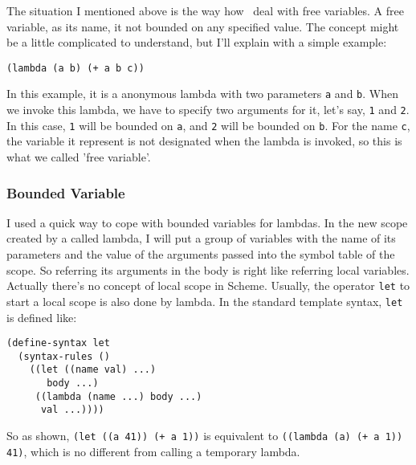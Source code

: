 The situation I mentioned above is the way how \revo\ deal with
free variables. A free variable, as its name, it not bounded on any
specified value. The concept might be a little complicated to
understand, but I'll explain with a simple example:
\begin{verbatim}
(lambda (a b) (+ a b c))
\end{verbatim}

In this example, it is a anonymous lambda with two parameters \verb+a+
and \verb+b+. When we invoke this lambda, we have to specify two
arguments for it, let's say, \verb+1+ and \verb+2+. In this case,
\verb+1+ will be bounded on \verb+a+, and \verb+2+ will be bounded on
\verb+b+. For the name \verb+c+, the variable it represent is not
designated when the lambda is invoked, so this is what we called 'free
variable'.

\subsubsection{Bounded Variable}
I used a quick way to cope with bounded variables for lambdas. In the
new scope created by a called lambda, I will put a group of variables
with the name of its parameters and the value of the arguments passed
into the symbol table of the scope. So referring its arguments in the
body is right like referring local variables. Actually there's no
concept of local scope in Scheme. Usually, the operator \verb+let+ to
start a local scope is also done by lambda. In the standard template
syntax, \verb+let+ is defined like:

\begin{verbatim}
(define-syntax let
  (syntax-rules ()
    ((let ((name val) ...)
       body ...)
     ((lambda (name ...) body ...)
      val ...))))
\end{verbatim}

So as shown, \verb^(let ((a 41)) (+ a 1))^ is equivalent to
\verb^((lambda (a) (+ a 1)) 41)^, which is no different from calling a
temporary lambda.

